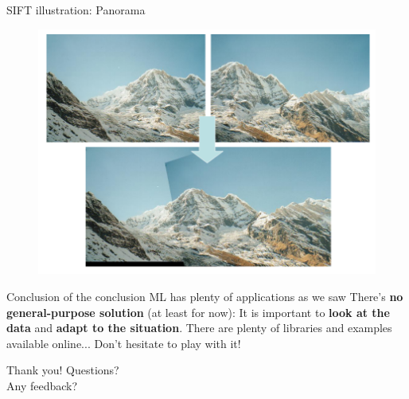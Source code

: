 \documentclass{beamer}
\newcommand{\1}[1]{\mathbbm{1}\left[#1\right]}
\begin{document}
\begin{frame}{SIFT illustration: Panorama}

\begin{figure}
\centering
\includegraphics[width=\textwidth]{images/sift_panorama_result.png}
\end{figure}
\end{frame}

\begin{frame}{Conclusion of the conclusion}
ML has plenty of applications as we saw
\pause
\vfill
There's \textbf{no general-purpose solution} (at least for now): It is important to \textbf{look at the data} and \textbf{adapt to the situation}.
\pause
\vfill
There are plenty of libraries and examples available online... Don't hesitate to play with it!
\end{frame}

\begin{frame}
\begin{center}
\huge{Thank you! Questions? \\ Any feedback?}
\end{center}
\end{frame}
\end{document}
